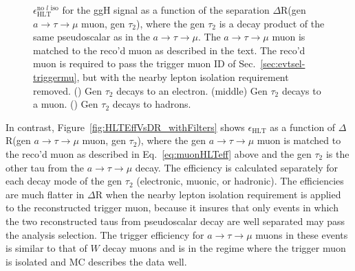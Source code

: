 \begin{figure}[hbtp]
\begin{center}
    \caption{$\epsilon_{\text{HLT}}^{\text{no }l\text{ iso}}$ for the ggH signal as a function of the separation $\Delta$R(gen $a\rightarrow\tau\rightarrow\mu$ muon, gen $\tau_{\text{2}}$), where the gen $\tau_{\text{2}}$ is a decay product of the same pseudoscalar as in the $a\rightarrow\tau\rightarrow\mu$.  The $a\rightarrow\tau\rightarrow\mu$ muon is matched to the reco'd muon as described in the text.  The reco'd muon is required to pass the trigger muon ID of Sec.~\ref{sec:evtsel-triggermu}, but with the nearby lepton isolation requirement removed.  (\cmsLeft) Gen $\tau_{\text{2}}$ decays to an electron.  (middle) Gen $\tau_{\text{2}}$ decays to a muon.  (\cmsRight) Gen $\tau_{\text{2}}$ decays to hadrons.}
    \label{fig:HLTEffVsDR}
  \end{center}
\end{figure}

In contrast, Figure~\ref{fig:HLTEffVsDR_withFilters} shows $\epsilon_{\text{HLT}}$ as a function of $\Delta$R(gen $a\rightarrow\tau\rightarrow\mu$ muon, gen $\tau_{\text{2}}$), where the gen $a\rightarrow\tau\rightarrow\mu$ muon is matched to the reco'd muon as described in Eq.~\ref{eq:muonHLTeff} above and the gen $\tau_{\text{2}}$ is the other tau from the $a\rightarrow\tau\rightarrow\mu$ decay.  The efficiency is calculated separately for each decay mode of the gen $\tau_{\text{2}}$ (electronic, muonic, or hadronic).  The efficiencies are much flatter in $\Delta$R when the nearby lepton isolation requirement is applied to the reconstructed trigger muon, because it insures that only events in which the two reconstructed taus from pseudoscalar decay are well separated may pass the analysis selection.  The trigger efficiency for $a\rightarrow\tau\rightarrow\mu$ muons in these events is similar to that of $W$ decay muons and is in the regime where the trigger muon is isolated and MC describes the data well.

